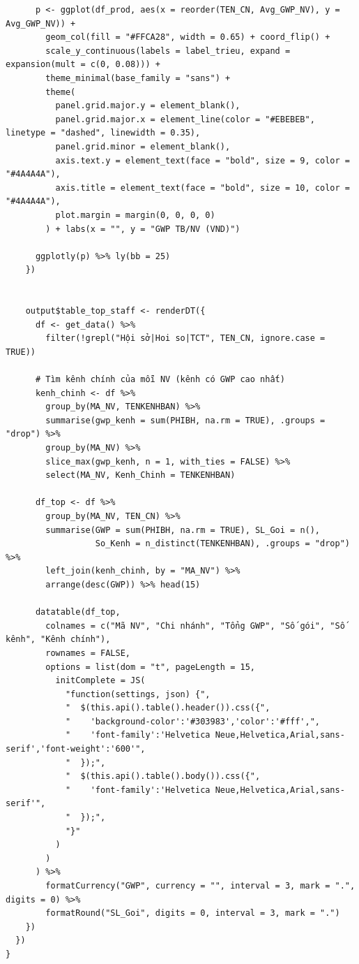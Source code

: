 \documentclass[12pt, a4paper]{article}
\begin{document}
\begin{lstlisting}
      p <- ggplot(df_prod, aes(x = reorder(TEN_CN, Avg_GWP_NV), y = Avg_GWP_NV)) +
        geom_col(fill = "#FFCA28", width = 0.65) + coord_flip() +
        scale_y_continuous(labels = label_trieu, expand = expansion(mult = c(0, 0.08))) +
        theme_minimal(base_family = "sans") +
        theme(
          panel.grid.major.y = element_blank(),
          panel.grid.major.x = element_line(color = "#EBEBEB", linetype = "dashed", linewidth = 0.35),
          panel.grid.minor = element_blank(),
          axis.text.y = element_text(face = "bold", size = 9, color = "#4A4A4A"),
          axis.title = element_text(face = "bold", size = 10, color = "#4A4A4A"),
          plot.margin = margin(0, 0, 0, 0)
        ) + labs(x = "", y = "GWP TB/NV (VND)")

      ggplotly(p) %>% ly(bb = 25)
    })


    output$table_top_staff <- renderDT({
      df <- get_data() %>%
        filter(!grepl("Hội sở|Hoi so|TCT", TEN_CN, ignore.case = TRUE))

      # Tìm kênh chính của mỗi NV (kênh có GWP cao nhất)
      kenh_chinh <- df %>%
        group_by(MA_NV, TENKENHBAN) %>%
        summarise(gwp_kenh = sum(PHIBH, na.rm = TRUE), .groups = "drop") %>%
        group_by(MA_NV) %>%
        slice_max(gwp_kenh, n = 1, with_ties = FALSE) %>%
        select(MA_NV, Kenh_Chinh = TENKENHBAN)

      df_top <- df %>%
        group_by(MA_NV, TEN_CN) %>%
        summarise(GWP = sum(PHIBH, na.rm = TRUE), SL_Goi = n(),
                  So_Kenh = n_distinct(TENKENHBAN), .groups = "drop") %>%
        left_join(kenh_chinh, by = "MA_NV") %>%
        arrange(desc(GWP)) %>% head(15)

      datatable(df_top,
        colnames = c("Mã NV", "Chi nhánh", "Tổng GWP", "Số gói", "Số kênh", "Kênh chính"),
        rownames = FALSE,
        options = list(dom = "t", pageLength = 15,
          initComplete = JS(
            "function(settings, json) {",
            "  $(this.api().table().header()).css({",
            "    'background-color':'#303983','color':'#fff',",
            "    'font-family':'Helvetica Neue,Helvetica,Arial,sans-serif','font-weight':'600'",
            "  });",
            "  $(this.api().table().body()).css({",
            "    'font-family':'Helvetica Neue,Helvetica,Arial,sans-serif'",
            "  });",
            "}"
          )
        )
      ) %>%
        formatCurrency("GWP", currency = "", interval = 3, mark = ".", digits = 0) %>%
        formatRound("SL_Goi", digits = 0, interval = 3, mark = ".")
    })
  })
}
\end{lstlisting}
\newpage
\end{document}
